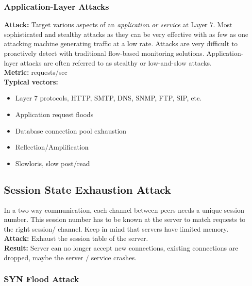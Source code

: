 \documentclass[11pt,oneside,a4paper]{article}
\begin{document}
\subsubsection{Application-Layer Attacks}

\noindent \textbf{Attack:} Target various aspects of an \textit{application or service} at Layer 7. Most sophisticated and stealthy attacks as they can be very effective with as few as one attacking machine generating traffic at a low rate. Attacks are very difficult to proactively detect with traditional flow-based monitoring solutions. Application-layer attacks are often referred to as stealthy or low-and-slow attacks.\\
\noindent \textbf{Metric:} requests/sec\\
\noindent \textbf{Typical vectors:}
\vspace{-\topsep}
\begin{itemize}
	\setlength{\itemsep}{0pt}
	\setlength{\parskip}{0pt}
	\item Layer 7 protocols, HTTP, SMTP, DNS, SNMP, FTP, SIP, etc.
	\item Application request floods
	\item Database connection pool exhaustion
	\item Reflection/Amplification
	\item Slowloris, slow post/read
\end{itemize}
\vspace{-\topsep}

\subsection{Session State Exhaustion Attack}

In a two way communication, each channel between peers needs a unique session number. This session number has to be known at the server to match requests to the right session/ channel. Keep in mind that servers have limited memory.\\
\noindent\textbf{Attack:} Exhaust the session table of the server.\\
\noindent \textbf{Result:} Server can no longer accept new connections, existing connections are dropped, maybe the server / service crashes.

\subsubsection{SYN Flood Attack}
\end{document}
